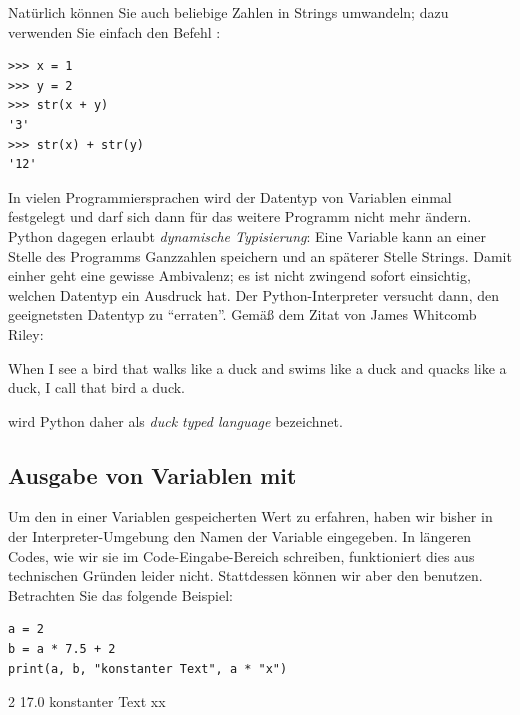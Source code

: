Natürlich können Sie auch beliebige Zahlen in Strings umwandeln; dazu verwenden Sie einfach den Befehl :

\begin{cmdbox}
\begin{verbatim}
>>> x = 1
>>> y = 2
>>> str(x + y)
'3'
>>> str(x) + str(y)
'12'
\end{verbatim}
\end{cmdbox}

\begin{hintbox}
In vielen Programmiersprachen wird der Datentyp von Variablen einmal festgelegt und darf sich dann für das weitere Programm nicht mehr ändern. Python dagegen erlaubt \emph{dynamische Typisierung}: Eine Variable  kann an einer Stelle des Programms Ganzzahlen speichern und an späterer Stelle Strings. Damit einher geht eine gewisse Ambivalenz; es ist nicht zwingend sofort einsichtig, welchen Datentyp ein Ausdruck hat. Der Python-Interpreter versucht dann, den geeignetsten Datentyp zu \enquote{erraten}. Gemäß dem Zitat von James Whitcomb Riley:
\begin{tcolorbox}[title=Zitat]
When I see a bird that walks like a duck and swims like a duck and quacks like a duck, I call that
bird a duck.
\end{tcolorbox}
wird Python daher als \emph{duck typed language} bezeichnet.
\end{hintbox}


\subsection{Ausgabe von Variablen mit }
Um den in einer Variablen gespeicherten Wert zu erfahren, haben wir bisher in der Interpreter-Umgebung den Namen der Variable eingegeben. In längeren Codes, wie wir sie im Code-Eingabe-Bereich schreiben, funktioniert dies aus technischen Gründen leider nicht. Stattdessen können wir aber den  benutzen. Betrachten Sie das folgende Beispiel:

\begin{codebox}
\begin{verbatim}
a = 2
b = a * 7.5 + 2
print(a, b, "konstanter Text", a * "x")
\end{verbatim}
\end{codebox}

\begin{codebox}[Ausgabe]
2 17.0 konstanter Text xx
\end{codebox}

